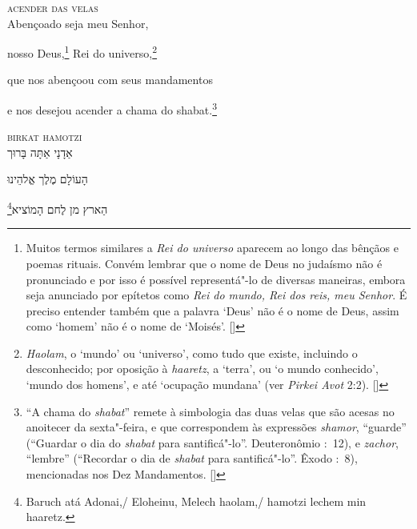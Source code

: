 \vspace*{1cm}

\textsc{acender das velas}\\[15pt]

Abençoado seja meu Senhor,

nosso Deus,\footnote{
		Muitos termos similares a \textit{Rei do universo} aparecem
		ao longo das bênçãos e poemas rituais. Convém lembrar que o nome de Deus
		no judaísmo não é pronunciado e por isso é possível
		representá"-lo de diversas maneiras, embora seja anunciado por
		epítetos como \textit{Rei do mundo, Rei dos reis, meu Senhor}.
		É preciso entender também que a palavra `Deus' não é o nome de
		Deus, assim como `homem' não é o nome de `Moisés'. []} 
Rei do universo,\footnote{\textit{Haolam}, o `mundo' ou `universo', como tudo
		que existe, incluindo o desconhecido; por oposição à \textit{haaretz},
		a `terra', ou `o mundo conhecido', `mundo dos homens', e até `ocupação
		mundana' (ver \textit{Pirkei Avot} 2:2). []}

que nos abençoou com seus mandamentos

e nos desejou acender a chama do shabat.\footnote{``A chama do \textit{shabat}'' remete à simbologia das duas velas
	que são acesas no anoitecer da sexta"-feira, e que correspondem às
	expressões \emph{shamor}, ``guarde'' (``Guardar o dia do
	\emph{shabat} para santificá"-lo''. Deuteronômio :~12),
	e \emph{zachor}, ``lembre''
	(``Recordar o dia de \emph{shabat} para santificá"-lo''. Êxodo
	:~8), mencionadas nos Dez Mandamentos. []}

\movetoevenpage
\raggedleft


\vspace*{1cm}

\textsc{birkat hamotzi}\\[15pt]

אַדָנָי אַתָּה בָּרוּך

הָעוֹלָם מֶלֶך אֱלהֵינוּ 

\footnote{Baruch atá Adonai,/ Eloheinu, Melech haolam,/ hamotzi lechem min haaretz.}הַארץ מן לֶחם הָמוֹציא

\movetooddpage
\raggedright

